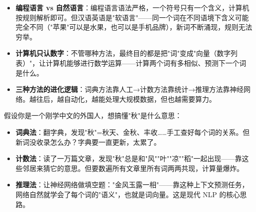 \documentclass[a4paper,11pt]{ctexart}
\begin{document}
\begin{beginnerbox}
    \begin{itemize}
        \item \textbf{编程语言 vs 自然语言}：编程语言语法严格，一个符号只有一个含义，计算机按规则解析即可。但汉语英语是"软语言"——同一个词在不同语境下含义可能完全不同（"苹果"可以是水果，也可以是手机品牌），新词不断涌现，规则无法穷举。
        \item \textbf{计算机只认数字}：不管哪种方法，最终目的都是把"词"变成"向量（数字列表）"，让计算机能够进行数学运算——计算两个词有多相似、预测下一个词是什么。
        \item \textbf{三种方法的进化逻辑}：词典方法靠人工→计数方法靠统计→推理方法靠神经网络。越往后，越自动化，越能处理大规模数据，但也越需要算力。
    \end{itemize}
\end{beginnerbox}

\begin{metaphorbox}
    假设你是一个刚学中文的外国人，想搞懂"秋"是什么意思：

    \begin{itemize}
        \item \textbf{词典法}：翻字典，发现"秋"=秋天、金秋、丰收……手工查好每个词的关系。但新词没收录怎么办？字典要一直更新，太累了。
        \item \textbf{计数法}：读了一万篇文章，发现"秋"总是和"风""叶""凉""稻"一起出现——靠这些邻居来猜它的意思。但要数遍所有文章里所有词两两共现，计算量爆炸。
        \item \textbf{推理法}：让神经网络做填空题："金风玉露一相\underline{\quad}"——靠这种上下文预测任务，网络自然就学会了每个词的"语义"，也就是词向量。这是现代 NLP 的核心思路。
    \end{itemize}
\end{metaphorbox}
\end{document}
